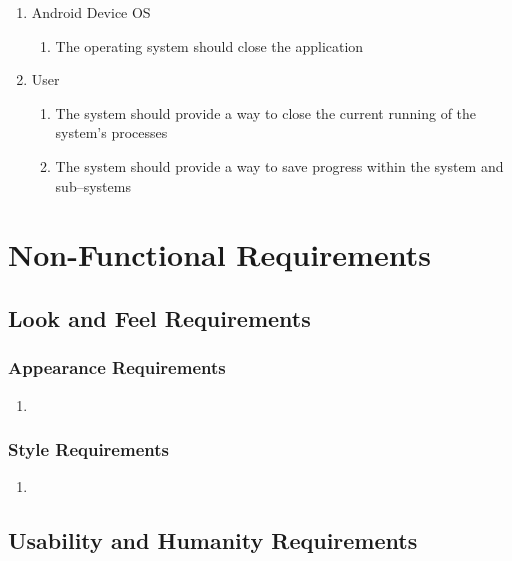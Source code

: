\documentclass[]{article}
\begin{document}
\begin{enumerate}
\begin{enumerate}
		\item Android Device OS
			\begin{enumerate}
				\item The operating system should close the application
			\end{enumerate}
		\item User
			\begin{enumerate}
				\item The system should provide a way to close the current running of the system’s processes
				\item The system should provide a way to save progress within the system and sub--systems
			\end{enumerate}
	\end{enumerate}
\end{enumerate}


\section{Non-Functional Requirements}
\label{sec:non-functional_requirements}
\subsection{Look and Feel Requirements}
\label{sub:look_and_feel_requirements}

\subsubsection{Appearance Requirements}
\label{ssub:appearance_requirements}
\begin{enumerate}[{LF}1. ]
	\item 
\end{enumerate}

\subsubsection{Style Requirements}
\label{ssub:style_requirements}
\begin{enumerate}[{LF}1. ]
	\item 
\end{enumerate}


\subsection{Usability and Humanity Requirements}
\label{sub:usability_and_humanity_requirements}
\end{document}
